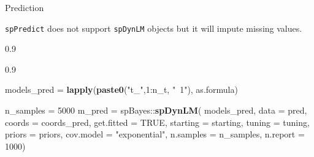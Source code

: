 \documentclass[11pt,ignorenonframetext,]{beamer}
\newenvironment{Shaded}{}{}
\newcommand{\DataTypeTok}[1]{\textcolor[rgb]{0.56,0.13,0.00}{#1}}
\newcommand{\DecValTok}[1]{\textcolor[rgb]{0.25,0.63,0.44}{#1}}
\newcommand{\KeywordTok}[1]{\textcolor[rgb]{0.00,0.44,0.13}{\textbf{#1}}}
\newcommand{\NormalTok}[1]{#1}
\newcommand{\OperatorTok}[1]{\textcolor[rgb]{0.40,0.40,0.40}{#1}}
\newcommand{\OtherTok}[1]{\textcolor[rgb]{0.00,0.44,0.13}{#1}}
\newcommand{\StringTok}[1]{\textcolor[rgb]{0.25,0.44,0.63}{#1}}
\let\oldShaded\Shaded
\let\endoldShaded\endShaded
\renewenvironment{Shaded}{\footnotesize\begin{spacing}{0.9}\oldShaded}{\endoldShaded\end{spacing}}
\begin{document}
\begin{frame}[fragile]{Prediction}
\protect\hypertarget{prediction}{}

\texttt{spPredict} does not support \texttt{spDynLM} objects but it will
impute missing values.

\begin{Shaded}
\end{Shaded}

\pause

\begin{Shaded}
\begin{Highlighting}[]
\NormalTok{models_pred =}\StringTok{ }\KeywordTok{lapply}\NormalTok{(}\KeywordTok{paste0}\NormalTok{(}\StringTok{"t_"}\NormalTok{,}\DecValTok{1}\OperatorTok{:}\NormalTok{n_t, }\StringTok{"~1"}\NormalTok{), as.formula)}

\NormalTok{n_samples =}\StringTok{ }\DecValTok{5000}
\NormalTok{m_pred =}\StringTok{ }\NormalTok{spBayes}\OperatorTok{::}\KeywordTok{spDynLM}\NormalTok{(}
\NormalTok{  models_pred, }\DataTypeTok{data =}\NormalTok{ pred, }\DataTypeTok{coords =}\NormalTok{ coords_pred, }\DataTypeTok{get.fitted =} \OtherTok{TRUE}\NormalTok{,}
  \DataTypeTok{starting =}\NormalTok{ starting, }\DataTypeTok{tuning =}\NormalTok{ tuning, }\DataTypeTok{priors =}\NormalTok{ priors,}
  \DataTypeTok{cov.model =} \StringTok{"exponential"}\NormalTok{, }\DataTypeTok{n.samples =}\NormalTok{ n_samples, }\DataTypeTok{n.report =} \DecValTok{1000}\NormalTok{)}


\end{Highlighting}
\end{Shaded}
\end{frame}
\end{document}
